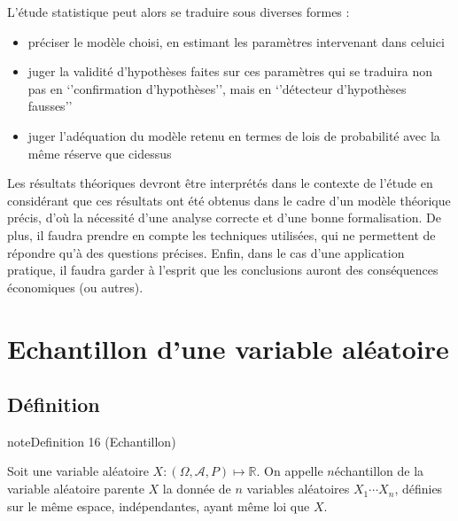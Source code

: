 \documentclass[letterpaper,10pt,english]{jupyterBook}
\begin{document}
\sphinxAtStartPar
L’étude statistique peut alors se traduire sous diverses formes :
\begin{itemize}
\item {} 
\sphinxAtStartPar
préciser le modèle choisi, en estimant les paramètres intervenant dans celui\sphinxhyphen{}ci

\item {} 
\sphinxAtStartPar
juger la validité d’hypothèses faites sur ces paramètres qui se traduira non pas en ‘’confirmation d’hypothèses’’, mais en ‘’détecteur d’hypothèses fausses’’

\item {} 
\sphinxAtStartPar
juger l’adéquation du modèle retenu en termes de lois de probabilité avec la même réserve que ci\sphinxhyphen{}dessus

\end{itemize}

\sphinxAtStartPar
Les résultats théoriques devront être interprétés dans le contexte de l’étude en considérant que ces résultats ont été obtenus dans le cadre d’un modèle théorique précis, d’où la nécessité d’une analyse correcte et d’une bonne formalisation. De plus, il faudra prendre en compte les techniques utilisées, qui ne permettent de répondre qu’à des questions précises. Enfin, dans le cas d’une application pratique, il faudra garder à l’esprit que les conclusions auront des conséquences économiques (ou autres).


\section{Echantillon d’une variable aléatoire}
\label{\detokenize{elemstats:echantillon-d-une-variable-aleatoire}}

\subsection{Définition}
\label{\detokenize{elemstats:definition}}\label{elemstats:definition-0}
\begin{sphinxadmonition}{note}{Definition 16 (Echantillon)}



\sphinxAtStartPar
Soit une variable aléatoire \(X:(\Omega,\mathcal A,P)\mapsto \mathbb{R}\). On appelle \(n\)\sphinxhyphen{}échantillon de la variable aléatoire parente \(X\) la donnée de \(n\) variables aléatoires \(X_1\cdots X_n\), définies sur le même espace, indépendantes, ayant même loi que \(X\).
\end{sphinxadmonition}
\end{document}
